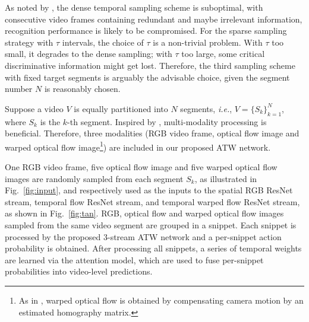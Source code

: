 \documentclass[runningheads,a4paper]{llncs}
\begin{document}
As noted by \cite{feichtenhofer2016convolutional,donahue2015long,wang2016temporal}, the dense temporal sampling scheme is suboptimal, with consecutive video frames containing redundant and maybe irrelevant information, recognition performance is likely to be compromised.  For the sparse sampling strategy with $\tau$ intervals, the choice of $\tau$ is a non-trivial problem. With $\tau$ too small, it degrades to the dense sampling; with $\tau$ too large, some critical discriminative information might get lost. Therefore, the third sampling scheme with fixed target segments is arguably the advisable choice, given the segment number $N$ is reasonably chosen.


Suppose a video $V$ is equally partitioned into $N$ segments, {\em i.e.}, $V = \{S_k\}^N_{k=1}$, where $S_k$ is the $k$-th segment. Inspired by \cite{simonyan2014two,wang2016temporal,zhang2011fast}, multi-modality processing is beneficial. Therefore, three modalities (RGB video frame, optical flow image and warped optical flow image\footnote{As in \cite{ wang2013action}, warped optical flow is obtained by compensating camera motion by an estimated homography matrix.}) are included in our proposed ATW network.


One RGB video frame, five optical flow image and five warped optical flow images are randomly sampled from each segment $S_k$, as illustrated in Fig.~\ref{fig:input}, and respectively used as the inputs to the spatial RGB ResNet stream, temporal flow ResNet stream, and temporal warped flow ResNet stream, as shown in Fig.~\ref{fig:tan}. RGB, optical flow and warped optical flow images sampled from the same video segment are grouped in a snippet. Each snippet is processed by the proposed $3$-stream ATW network and a per-snippet action probability is obtained. After processing all snippets, a series of temporal weights are learned via the attention model, which are used to fuse per-snippet probabilities into video-level predictions.
\end{document}
